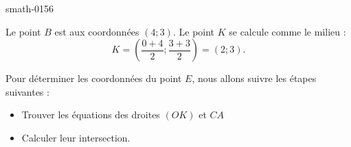 
\begin{corrige}{smath-0156}

Le point \( B\) est aux coordonnées \( (4;3)\). Le point \( K\) se calcule comme le milieu :
\begin{equation}
    K=\left( \frac{ 0+4 }{2};\frac{ 3+3 }{2} \right)=(2;3).
\end{equation}


Pour déterminer les coordonnées du point \( E\), nous allons suivre les étapes suivantes :
\begin{itemize}
    \item Trouver les équations des droites \( (OK)\) et \( CA\)
    \item Calculer leur intersection.
\end{itemize}


\end{corrige}

